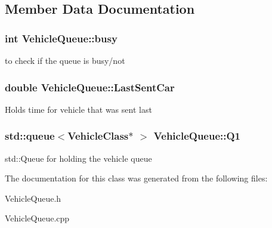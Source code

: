 \subsection{Member Data Documentation}
\hypertarget{class_vehicle_queue_a4ce16496b3665d0b91a8b5baf158c3a3}{
\subsubsection[{busy}]{\setlength{\rightskip}{0pt plus 5cm}int Vehicle\-Queue\-::busy}}\label{class_vehicle_queue_a4ce16496b3665d0b91a8b5baf158c3a3}
to check if the queue is busy/not \hypertarget{class_vehicle_queue_a329310055fa8fd635fd6740a8400b88d}{
\subsubsection[{Last\-Sent\-Car}]{\setlength{\rightskip}{0pt plus 5cm}double Vehicle\-Queue\-::\-Last\-Sent\-Car}}\label{class_vehicle_queue_a329310055fa8fd635fd6740a8400b88d}
Holds time for vehicle that was sent last \hypertarget{class_vehicle_queue_a64dd34f2ca5bee22e9bf07be665c4d13}{
\subsubsection[{Q1}]{\setlength{\rightskip}{0pt plus 5cm}std\-::queue$<${\bf Vehicle\-Class}$\ast$ $>$ Vehicle\-Queue\-::\-Q1}}\label{class_vehicle_queue_a64dd34f2ca5bee22e9bf07be665c4d13}
std\-::\-Queue for holding the vehicle queue 

The documentation for this class was generated from the following files\-:\begin{DoxyCompactItemize}
\item 
Vehicle\-Queue.\-h\item 
Vehicle\-Queue.\-cpp\end{DoxyCompactItemize}
